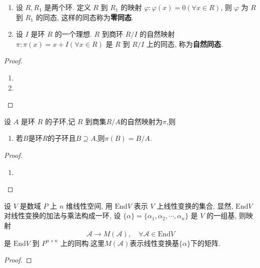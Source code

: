 \documentclass[../../main.tex]{subfiles}%
\begin{document}
\begin{theorem}\label{theorem:抽象代数--1.5.7}
\begin{enumerate}
\item 设 \( R, R_1 \) 是两个环. 定义 \( R \) 到 \( R_1 \) 的映射 \( \varphi: \varphi(x) = 0 (\forall x \in R) \), 则 \( \varphi \) 为 \( R \) 到 \( R_1 \) 的同态, 这样的同态称为\textbf{零同态}.

\item 设 \( I \) 是环 \( R \) 的一个理想. \( R \) 到商环 \( R/I \) 的自然映射 \( \pi: \pi(x) = x + I (\forall x \in R) \) 是 \( R \) 到 \( R/I \) 上的同态, 称为\textbf{自然同态}.
\end{enumerate}
\end{theorem}
\begin{proof}
\begin{enumerate}
\item 

\item 
\end{enumerate}

\end{proof}

\begin{proposition}\label{proposition:环的自然同态的基本性质}
设 \( A \) 是环 \( R \) 的子环,记 \( R \) 到商集\( R/A \)的自然映射为$\pi$,则
\begin{enumerate}[(1)]
\item\label{proposition:环的自然同态的基本性质-1} 若$B$是环$R$的子环且$B\supseteq A$,则$\pi(B)=B/A.$

\end{enumerate}
\end{proposition}
\begin{proof}
\begin{enumerate}[(1)]
\item 

\end{enumerate}

\end{proof}

\begin{example}
设 \( V \) 是数域 \( P \) 上 \( n \) 维线性空间, 用 \( \text{End}V \) 表示 \( V \) 上线性变换的集合, 显然, \( \text{End}V \) 对线性变换的加法与乘法构成一环, 设 \( \{\alpha\} = \{\alpha_1, \alpha_2, \cdots, \alpha_n\} \) 是 \( V \) 的一组基, 则映射
\[
\mathcal{A} \to M(\mathcal{A}), \quad \forall \mathcal{A} \in \text{End}V
\]
是 \( \text{End}V \) 到 \( P^{n \times n} \) 上的同构.这里$M(\mathcal{A})$表示线性变换基$\{\alpha\}$下的矩阵.
\end{example}
\begin{proof}



\end{proof}
\end{document}

